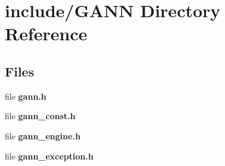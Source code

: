 \section{include/\+G\+A\+N\+N Directory Reference}
\label{dir_2a1bf6822788bf42b0b69b4e959fd48f}
\subsection*{Files}
\begin{DoxyCompactItemize}
\item 
file {\bfseries gann.\+h}
\item 
file {\bfseries gann\+\_\+const.\+h}
\item 
file {\bfseries gann\+\_\+engine.\+h}
\item 
file {\bfseries gann\+\_\+exception.\+h}
\end{DoxyCompactItemize}
